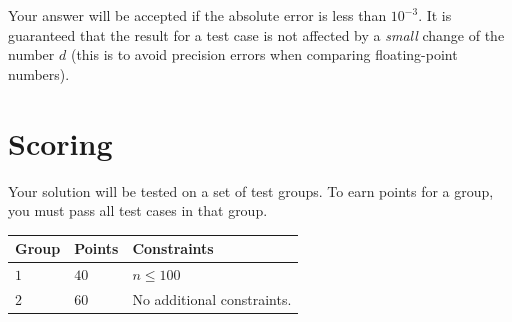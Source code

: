 Your answer will be accepted if the absolute error is less than $10^{-3}$.
It is guaranteed that the result for a test case is not affected by a \emph{small} change of the number $d$ (this is to avoid precision errors when comparing floating-point numbers).

\section*{Scoring}
Your solution will be tested on a set of test groups.
To earn points for a group, you must pass all test cases in that group.

\noindent
\begin{tabular}{| l | l | p{12cm} |}
  \hline
  \textbf{Group} & \textbf{Points} & \textbf{Constraints} \\ \hline
  $1$    & $40$        & $n \leq 100$ \\ \hline
  $2$    & $60$        & No additional constraints.  \\ \hline
\end{tabular}
